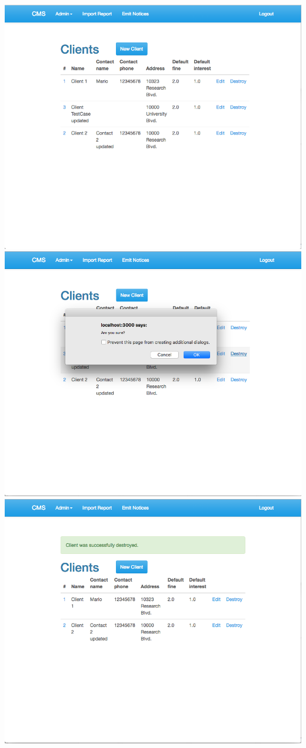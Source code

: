 \begin{itemize}
    \includegraphics[scale=0.25]{./images/ss/client/delete/2.png}\\
    \includegraphics[scale=0.25]{./images/ss/client/delete/3.png}
    \includegraphics[scale=0.25]{./images/ss/client/delete/4.png}
\end{itemize}
